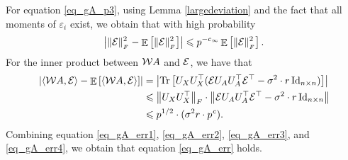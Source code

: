 	For equation \eqref{eq_gA_p3}, using Lemma \ref{largedeviation} and the fact that all moments of $\varepsilon_i$ exist, we obtain that with high probability
	\begin{align}
		\left\lvert\|\mathcal{E}\|_{_{F}}^2 - \mathop{\mathbb{E}}\left[ \|\mathcal{E}\|_{_{F}}^2 \right]\right\rvert \leqslant p^{-c_{\infty}} \mathop{\mathbb{E}}\left[ \|\mathcal{E}\|_{_{F}}^2 \right]. \label{eq_gA_err3}
	\end{align}
	For the inner product between ${\mathcal W} A$ and $\mathcal{E}$, we have that
	\begin{align}
		{\left| {\langle {\mathcal W}A, \mathcal{E}\rangle - \mathop{\mathbb{E}}\left[ \langle {\mathcal W}A, \mathcal{E}\rangle \right]} \right|} &= {\left| {\operatorname{Tr}\left[U_X U_X^{\top} (\mathcal{E} U_AU_A^{\top} \mathcal{E}^{\top} - \sigma^2 \cdot r \operatorname{Id}_{n\times n})\right]} \right|} \nonumber  \\
		&\leqslant \left\| U_{X} U_X^{\top} \right\|_{F} \cdot \left\| \mathcal{E} U_A U_A^{\top} \mathcal{E}^{\top} - \sigma^2 \cdot r \operatorname{Id}_{n\times n} \right\| \nonumber \\
		&\leqslant p^{1/2} \cdot (\sigma^2 r\cdot p^{{\mathit{c}}}). \label{eq_gA_err4}
	\end{align}
	Combining equation \eqref{eq_gA_err1}, \eqref{eq_gA_err2}, \eqref{eq_gA_err3}, and \eqref{eq_gA_err4}, we obtain that equation \eqref{eq_gA_err} holds.

